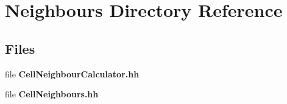 \section{Neighbours Directory Reference}
\label{dir_228d3636295317ec004e720afd777585}
\subsection*{Files}
\begin{DoxyCompactItemize}
\item 
file {\bfseries Cell\-Neighbour\-Calculator.\-hh}
\item 
file {\bfseries Cell\-Neighbours.\-hh}
\end{DoxyCompactItemize}
